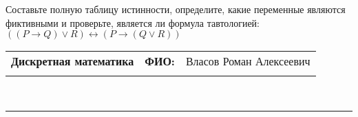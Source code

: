 \documentclass[10pt]{exam}
\newcommand{\class}{Дискретная математика}
\newcommand{\examdate}{}
\begin{document}
\begin{questions}
\begin{enumerate} [a)]
\end{enumerate}\question Составьте полную таблицу истинности, определите, какие переменные являются фиктивными и проверьте, является ли формула тавтологией:
$((P \rightarrow Q) \lor R) \leftrightarrow (P \rightarrow (Q \lor R))$

\end{questions}
\newpage
\begin{flushright}
\begin{tabular}{p{2.8in} r l}
\textbf{\class} & \textbf{ФИО:} &Власов Роман Алексеевич
\\

\textbf{\examdate} &&\\
\end{tabular}\\
\end{flushright}
\rule[1ex]{\textwidth}{.1pt}
\end{document}
